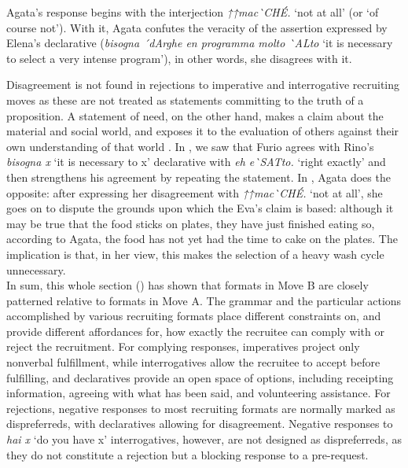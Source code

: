 \documentclass[output=paper,modfonts]{langscibook}
\begin{document}
Agata's response begins with the interjection \textit{↑↑mac\`{}CHÉ.} ‘not at all’ (or ‘of course not’). With it, Agata confutes the veracity of the assertion expressed by Elena's declarative (\textit{bisogna ´{}dArghe en programma molto \`{}ALto} ‘it is necessary to select a very intense program’), in other words, she disagrees with it. 

Disagreement is not found in rejections to imperative and interrogative recruiting moves as these are not treated as statements committing to the truth of a proposition. A statement of need, on the other hand, makes a claim about the material and social world, and exposes it to the evaluation of others against their own understanding of that world \citep[see also][]{ZinkenOgiermann2011}. In , we saw that Furio agrees with Rino's \textit{bisogna x} ‘it is necessary to x’ declarative with \textit{eh e\`{}SATto.} ‘right exactly’ and then strengthens his agreement by repeating the statement. In , Agata does the opposite: after expressing her disagreement with \textit{↑↑mac\`{}CHÉ.} ‘not at all’, she goes on to dispute the grounds upon which the Eva's claim is based: although it may be true that the food sticks on plates, they have just finished eating so, according to Agata, the food has not yet had the time to cake on the plates. The implication is that, in her view, this makes the selection of a heavy wash cycle unnecessary.\\

\noindent
In sum, this whole section () has shown that formats in Move B are closely patterned relative to formats in Move A. The grammar and the particular actions accomplished by various recruiting formats place different constraints on, and provide different affordances for, how exactly the recruitee can comply with or reject the recruitment. For complying responses, imperatives project only nonverbal fulfillment, while interrogatives allow the recruitee to accept before fulfilling, and declaratives provide an open space of options, including receipting information, agreeing with what has been said, and volunteering assistance. For rejections, negative responses to most recruiting formats are normally marked as dispreferreds, with declaratives allowing for disagreement. Negative responses to \textit{hai x} ‘do you have x’ interrogatives, however, are not designed as dispreferreds, as they do not constitute a rejection but a blocking response to a pre-request.
\end{document}
